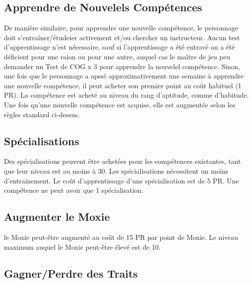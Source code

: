 \subsection{Apprendre de Nouvelels Compétences} \label{sec:learning-new-skills} 

De manière similaire, pour apprendre une nouvelle compétence, le personnage doit s'entraîner/étudeier activement et/ou chercher un instructeur. Aucun test d'apprentissage n'est nécessaire, sauf si l'apprentissage a été entravé ou a été déficient pour une raion ou pour une autre, auquel cas le maître de jeu peu demander un Test de COG x 3 pour apprendre la nouvelel compétence. Sinon, une fois que le personnage a apssé approximativement une semaine à apprendre une nouvelle compétence, il peut acheter son premier point au coût habituel (1 PR). La compétence est acheté au niveau du rang d'aptitude, comme d'habitude. Une fois qu'une nouvelle compétence est acquise, elle est augmentée selon les règles standard ci-dessus. 

\subsection{Spécialisations} \label{sec:new-specializations} Des spécialisations peuvent être achetées pour les compétences existantes, tant que leur niveau est au moins à 30. Les spécialisations nécessitent un moins d'entraïnement. Le coût d'apprentissage d'une spécialisation est de 5 PR. Une compétence ne peut avoir que 1 spécialisation. 

\subsection{Augmenter le Moxie} \label{sec:improving-moxie} 

le Moxie peut-être augmenté au coût de 15 PR par point de Moxie. Le niveau maximum auquel le Moxie peut-être élevé est de 10. 

\subsection{Gagner/Perdre des Traits} \label{sec:gaining-losing-traits} 

